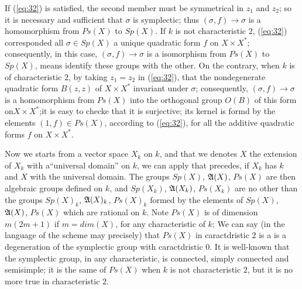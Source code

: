 \documentclass[12pt]{amsart}
\newcounter{ssection}
\renewcommand{\subsection}{
  \addtocounter{ssection}{1}{\bf  \arabic{ssection}.\  }}
\begin{document}
If (\ref{eq:32}) is satisfied, 
the second member must be symmetrical in $z_1$ and $z_2$;
so it is necessary and sufficient that $\sigma$ is symplectic;
thus $(\sigma, f)\to \sigma$ is a homomorphism from $Ps(X)$ to $Sp(X)$.
If $k$ is not characteristic $2$, (\ref{eq:32}) corresponded all $\sigma \in Sp(X)$
a unique quadratic form $f$ on $X\times X^*$; 
consequently, in this case, $(\sigma,f)\to \sigma$ is a
isomorphism from $Ps(X)$ to  $Sp(X)$,
means identify these groups with the other.
On the contrary, when $k$ is of characteristic $2$,
 by taking $z_1 =z_2$ in (\ref{eq:32}), that the nondegenerate quadratic form $B(z,z)$ 
of $X\times X^*$  invariant under $\sigma$;  consequently, $(\sigma,f)\to \sigma$ is a homomorphism from $Ps(X)$
into the orthogonal group $O(B)$ of this form on$X\times X^*$;it is easy to checke that it is 
surjective; its kernel is formd by the elements $(1,f)\in Ps (X)$, according to (\ref{eq:32}),
for all the additive quadratic forms $f$ on $X\times X^*$.

Now we starts from a vector space $X_k$ on $k$, 
and that we denotes $X$ the extension of $X_k$ with a``universal domain'' on $k$,
we can apply that precedes, if $X_k$ has $k$ and
$X$ with the universal domain. The groups $Sp(X)$, ${\mathfrak{A}}(X)$, $Ps(X)$ are then algebraic groups defined on $k$, 
and $Sp(X_k)$, ${\mathfrak{A}}(X_k)$, $Ps(X_k)$ are no other than the groups 
$Sp(X)_k$, ${\mathfrak{A}}(X)_k$, $Ps(X)_k$  formed by the elements of $Sp(X)$, ${\mathfrak{A}}(X)$, 
$Ps(X)$ which are rational on $k$. 
Note $Ps(X)$ is of dimension $m(2m + 1)$ if $m =dim(X)$, for any characteristic of $k$;
We can say (in the language of the scheme may precisely) that $Ps(X)$ in 
caractdristic $2$ is a  is a degeneration of the
 symplectic group with caractdristic $0$. 
It is well-known that the symplectic group, in any characteristic, 
is connected, 
simply connected and semisimple;
it is the same of $Ps(X)$ when $k$ is not characteristic $2$, 
but it is no more true in characteristic $2$.

\subsection{}

\subsection{}

\setcounter{ssection}{35}
\end{document}
